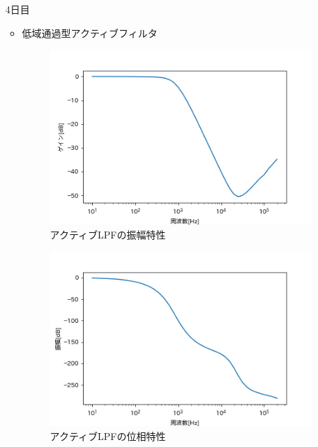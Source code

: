 \documentclass[dvipdfmx, twocolumn]{jsarticle}
\begin{document}
\begin{enumerate}
\begin{itemize}
\end{itemize}
\item[4日目]

\begin{itemize}


\item 低域通過型アクティブフィルタ

\begin{figure}[H]
\begin{center}
\includegraphics[scale = 0.5]{GactL.png}
\caption{アクティブLPFの振幅特性}
\end{center}
\end{figure}

\begin{figure}[H]
\begin{center}
\includegraphics[scale = 0.5]{PactL.png}
\caption{アクティブLPFの位相特性}
\end{center}
\end{figure}


\end{itemize}
\end{enumerate}
\end{document}

